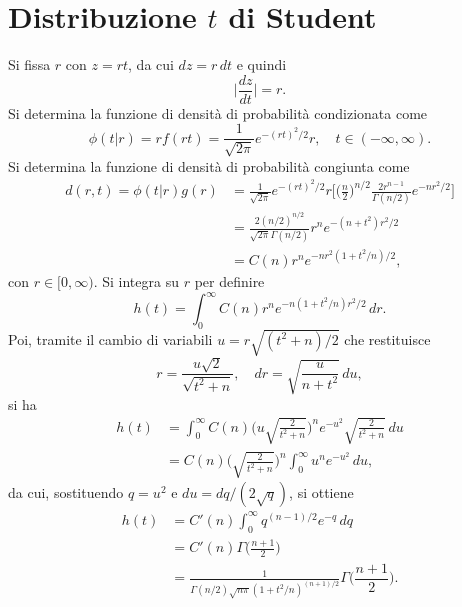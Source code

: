 \documentclass{article}
\theoremstyle{remark}
\begin{document}
\section{Distribuzione \texorpdfstring{$t$}{t} di Student}
Si fissa $r$ con $z = rt$, da cui $dz = r\,dt$ e quindi
\begin{equation}
    \bigg|\frac{dz}{dt}\bigg| = r.
\end{equation}
Si determina la funzione di densità di probabilità condizionata come
\begin{equation}
    \phi(t|r) = r f(rt) = \frac{1}{\sqrt{2\pi}}e^{-(rt)^2/2}r,\quad t \in (-\infty,\infty).
\end{equation}
Si determina la funzione di densità di probabilità congiunta come
\begin{equation}
    \begin{split}
        d(r,t) = \phi(t|r)g(r) &= \frac{1}{\sqrt{2\pi}}e^{-(rt)^2/2}r\bigg[\bigg(\frac{n}{2}\bigg)^{n/2}\frac{2r^{n - 1}}{\Gamma(n/2)}e^{-nr^2/2}\bigg] \\
        &= \frac{2(n/2)^{n/2}}{\sqrt{2\pi}\Gamma(n/2)}r^ne^{-(n + t^2)r^2/2} \\
        &= C(n)r^ne^{-nr^2(1 + t^2/n)/2},
    \end{split}
\end{equation}
con $r \in [0,\infty)$. Si integra su $r$ per definire
\begin{equation}
    h(t) = \int_0^\infty C(n)r^n e^{-n(1 + t^2/n)r^2/2}\,dr.
\end{equation}
Poi, tramite il cambio di variabili $u = r\sqrt{(t^ 2 + n)/2}$ che restituisce 
\begin{equation}
    r = \frac{u\sqrt{2}}{\sqrt{t^2 + n}},\quad dr = \sqrt{\frac{u}{n + t^2}}\,du,
\end{equation}
si ha
\begin{equation}
    \begin{split}
        h(t) &= \int_0^\infty C(n)\bigg(u\sqrt{\frac{2}{t^2 + n}}\bigg)^ne^{-u^2}\sqrt{\frac{2}{t^2 + n}}\,du \\
        &= C(n)\bigg(\sqrt{\frac{2}{t^2 + n}}\bigg)^n\int_0^\infty u^ne^{-u^2}\,du,
    \end{split}
\end{equation}
da cui, sostituendo $q = u^2$ e $du = dq/(2\sqrt{q})$, si ottiene
\begin{equation}
    \begin{split}
        h(t) &= C'(n)\int_0^\infty q^{(n - 1)/2}e^{-q}\,dq \\
        &= C'(n)\Gamma\bigg(\frac{n + 1}{2}\bigg) \\ 
        &= \frac{1}{\Gamma(n/2)\sqrt{n\pi}(1 + t^2/n)^{(n + 1)/2}}\Gamma\bigg(\dfrac{n + 1}{2}\bigg).
    \end{split}
\end{equation}
\end{document}
